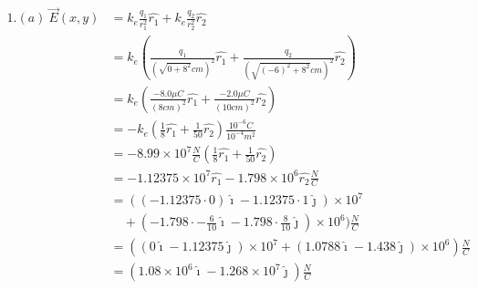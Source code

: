 \documentclass[11pt]{article}
\begin{document}
\begin{align*}
1.(a) \ 
\overrightarrow{E}(x,y) &= k_{e} \frac{q_{1}}{r_{1}^{2}} \hat{r_{1}} + k_{e} \frac{q_{2}}{r_{2}^{2}} \hat{r_{2}} \ \\
          &= k_{e} (\frac{q_{1}}{( \sqrt{0 + 8^{2}} cm )^{2}} \hat{r_{1}} + \frac{q_{{2}}}{( \sqrt{(-6)^{2} + 8^{2}} cm )^{2}} \hat{r_{2}}) \\
          &= k_{e} (\frac{-8.0 \mu C}{( 8 cm )^{2}} \hat{r_{1}} + \frac{-2.0 \mu C}{( 10 cm )^{2}} \hat{r_{2}}) \\
          &= - k_{e} (\frac{1}{8} \hat{r_{1}} + \frac{1}{50} \hat{r_{2}}) \frac{10^{-6} C}{10^{-4} m^{2}} \\
          &= - 8.99 \times 10^{7} \frac{N}{C} (\frac{1}{8} \hat{r_{1}} + \frac{1}{50} \hat{r_{2}}) \\
          &= - 1.12375 \times 10^{7} \hat{r_{1}} - 1.798 \times 10^{6} \hat{r_{2}} \frac{N}{C} \\
          &= ( (- 1.12375 \cdot 0)\hat{\imath} - 1.12375 \cdot 1 \hat{\jmath}) \times 10^{7} \\
& \quad + (- 1.798 \cdot -\frac{6}{10} \hat{\imath} - 1.798 \cdot \frac{8}{10} \hat{\jmath}) \times 10^{6} ) \frac{N}{C} \\
          &= ( (0 \hat{\imath} - 1.12375 \hat{\jmath}) \times 10^{7} + (1.0788 \hat{\imath} - 1.438\hat{\jmath})  \times 10^{6} ) \frac{N}{C} \\
          &= (1.08 \times 10^{6} \hat{\imath} - 1.268 \times 10^{7} \hat{\jmath}) \frac{N}{C}
\end{align*}

\newpage
\end{document}
